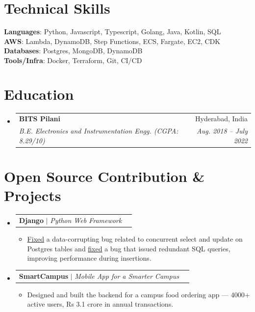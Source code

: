 \documentclass[a4paper,11pt]{article}
\makeatletter
\newcommand{\resumeItem}[1]{
  \item\small{
    {#1 \vspace{-3pt}}
  }
}
\newcommand{\resumeSubheading}[4]{
  \vspace{-2pt}\item
    \begin{tabular*}{0.97\textwidth}[t]{l@{\extracolsep{\fill}}r}
      \textbf{#1} & #2 \\
		  \textit{\small#3} & \textit{\small #4} \\
    \end{tabular*}\vspace{-7pt}
}
\newcommand{\resumeProjectHeading}[2]{
    \item
    \begin{tabular*}{0.97\textwidth}{l@{\extracolsep{\fill}}r}
      \small#1 & #2 \\
    \end{tabular*}\vspace{-7pt}
}
\newcommand{\resumeSubHeadingListStart}{\begin{itemize}[leftmargin=0.15in, label={}]}
\newcommand{\resumeSubHeadingListEnd}{\end{itemize}}
\newcommand{\resumeItemListStart}{\begin{itemize}}
\newcommand{\resumeItemListEnd}{\end{itemize}\vspace{-5pt}}
\makeatother
\begin{document}
\section{Technical Skills}
    \small{
     \textbf{Languages}{: Python, Javascript, Typescript, Golang, Java, Kotlin, SQL} \\
     \textbf{AWS}{: Lambda, DynamoDB, Step Functions, ECS, Fargate, EC2, CDK} \\
     \textbf{Databases}{: Postgres, MongoDB, DynamoDB} \\
     \textbf{Tools/Infra}{: Docker, Terraform, Git, CI/CD} \\
    }


\section{Education}
  \resumeSubHeadingListStart
    \resumeSubheading
      {BITS Pilani}{Hyderabad, India}
			{B.E. Electronics and Instrumentation Engg. (CGPA: 8.29/10)}{Aug. 2018 -- July 2022}
  \resumeSubHeadingListEnd

\vspace{2pt}
\section{Open Source Contribution \& Projects}
    \resumeSubHeadingListStart
		\resumeProjectHeading{\textbf{Django} $|$ \emph{Python Web Framework}}{}
		\resumeItemListStart
        \resumeItem{\href{https://github.com/django/django/pull/12434}{Fixed} a data-corrupting bug related to concurrent select and update on Postgres tables and \href{https://github.com/django/django/pull/12496}{fixed} a bug that issued redundant SQL queries, improving performance during insertions.}
		\resumeItemListEnd
      \vspace{2pt}
      \resumeProjectHeading
					{\textbf{SmartCampus} $|$ \emph{Mobile App for a Smarter
					Campus}}{\textit{\href{https://play.google.com/store/apps/details?id=com.smartcampus\_bphc}}}
          \resumeItemListStart
						\resumeItem{Designed and built the backend for a campus food ordering app — 4000+ active users, Rs 3.1 crore in annual transactions.}
          \resumeItemListEnd
		\resumeSubHeadingListEnd
\end{document}
